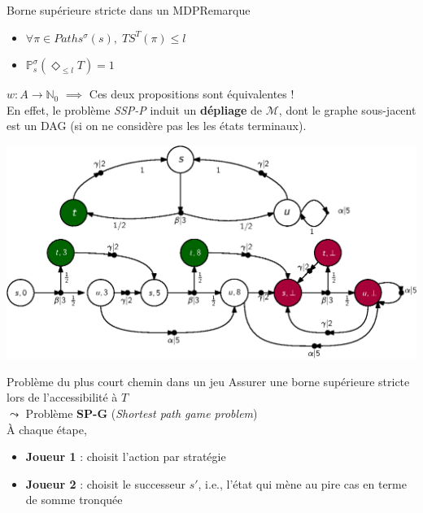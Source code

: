 \documentclass[compress]{beamer}
\begin{document}
\begin{frame}{Borne supérieure stricte dans un MDP}{Remarque}
  \begin{itemize}
    \item $\forall \pi \in Paths^\sigma(s), \; TS^T(\pi) \leq l$
    \item $\mathbb{P}_s^\sigma (\Diamond_{\leq l} T ) = 1$ \\
  \end{itemize}
  {\small {\color{fibeamer@orange}$w:A \rightarrow \mathbb{N}_0$} $\implies$ Ces deux propositions sont équivalentes ! \\
  En effet, le problème \textit{SSP-P} induit un \textbf{\color{fibeamer@orange}dépliage} de $\mathcal{M}$, dont le graphe sous-jacent est un DAG (si on ne considère pas les les états terminaux).}
  \begin{center}
    \includegraphics[width=0.7\linewidth]{resources/unfolding}
  \end{center}
\end{frame}

\begin{frame}{Problème du plus court chemin dans un jeu}
    Assurer une borne supérieure stricte lors de l'accessibilité à $T$  \\ {\color{fibeamer@blue}$\leadsto$} Problème \textbf{\color{fibeamer@orange}SP-G} (\textit{Shortest path game problem}) \\
    \`A chaque étape,
    \begin{itemize}
      \item \textbf{Joueur 1} : choisit l'action par stratégie
      \item \textbf{Joueur 2} : choisit le successeur $s'$, i.e., l'état qui mène au pire cas en terme de somme tronquée
    \end{itemize}
\end{frame}
\end{document}
